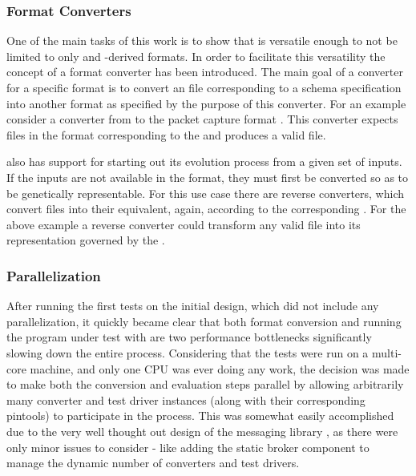 \subsubsection{Format Converters}
One of the main tasks of this work is to show that \xmlmate is versatile enough to not be limited to 
only \xml and \xml-derived formats. In order to facilitate this versatility the concept of a format 
converter has been introduced. The main goal of a converter for a specific format is to convert an 
\xml file corresponding to a schema specification into another format as specified by the purpose 
of this converter. For an example consider a converter from \xml to the packet capture format \pcap. 
This converter expects \xml files in the format corresponding to the \pcap{} \xsd and produces a 
valid \pcap file. 


\xmlmate also has support for starting out its evolution process from a given set of inputs. If the   
inputs are not available in the \xml format, they must first be converted so as to be genetically 
representable. For this use case there are reverse converters, which convert files into their 
\xml equivalent, again, according to the corresponding \xsd. For the above example a reverse converter 
could transform any valid \pcap file into its \xml representation governed by the \pcap{} \xsd.
\subsubsection{Parallelization}
\label{sec:par}
After running the first tests on the initial \xmlmate design, which did not include any parallelization, 
it quickly became clear that both format conversion and running the program under test with \pin 
are two performance bottlenecks significantly slowing down the entire process. Considering that the 
tests were run on a multi-core machine, and only one CPU was ever doing any work, the decision was 
made to make both the conversion and evaluation steps parallel by allowing arbitrarily many 
converter and test driver instances (along with their corresponding pintools) to participate in the process. 
This was somewhat easily accomplished due to the very well thought out design of the messaging library \zmq, 
as there were only minor issues to consider - like adding the static broker component to 
manage the dynamic number of converters and test drivers.

